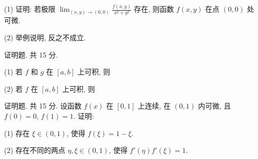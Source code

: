 (1) 证明: 若极限 $\lim_{(x,y)\to (0,0)}\frac{f(x,y)}{x^2 + y^2}$ 存在, 则函数 $f(x,y)$ 在点 $(0,0)$ 处可微.\par
(2) 举例说明, 反之不成立.\par
\par{}
证明题. 共 15 分.\par
\par{}
(1) 若 $f$ 和 $g$ 在 $[a, b]$ 上可积, 则\par
\nopagebreak[4]
\par{}
(2) 若 $f$ 在 $[a, b]$ 上可积, 则\par
\nopagebreak[4]
\par{}
证明题. 共 15 分. 设函数 $f(x)$ 在 $[0,1]$ 上连续, 在 $(0,1)$ 内可微, 且 $f(0) = 0$, $f(1) = 1$. 证明:\par
(1) 存在 $\xi \in (0,1)$, 使得 $f(\xi) = 1 - \xi$.\par
(2) 存在不同的两点 $\eta, \xi \in (0,1)$, 使得 $f'(\eta)f'(\xi) = 1$.\par
